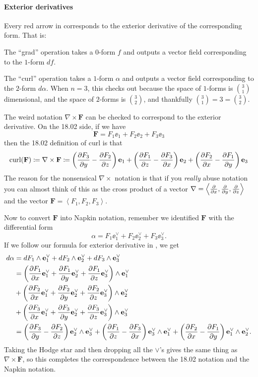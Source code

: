 \paragraph{Exterior derivatives}
Every red arrow in  corresponds to the exterior derivative
of the corresponding form.
That is:
\begin{itemize}
	\ii The ``grad'' operation takes a $0$-form $f$ and outputs a vector field
	corresponding to the $1$-form $df$.

	\ii The ``curl'' operation takes a $1$-form $\alpha$ and outputs a vector field
	corresponding to the $2$-form $d\alpha$.
	When $n = 3$, this checks out because the space of $1$-forms is $\binom 31$ dimensional,
	and the space of $2$-forms is $\binom 32$, and thankfully $\binom 31 = 3 = \binom 32$.

	The weird notation $\nabla \times \mathbf{F}$
	can be checked to correspond to the exterior derivative.
	On the 18.02 side, if we have
	\[ \mathbf{F} = F_1 \ee_1 + F_2 \ee_2 + F_3 \ee_3 \]
	then the 18.02 definition of curl is that
	\[ \operatorname{curl}(\mathbf{F}) \coloneqq \nabla \times \mathbf{F} \coloneqq
		\left( \pdv{F_3}{y} - \pdv{F_2}{z} \right) \mathbf e_1
		+ \left( \pdv{F_1}{z} - \pdv{F_3}{x} \right) \mathbf e_2
		+ \left( \pdv{F_2}{x} - \pdv{F_1}{y} \right) \mathbf e_3
	\]
	The reason for the nonsensical $\nabla \times$ notation
	is that if you \emph{really} abuse notation you can almost think of this as
	the cross product of a vector $\nabla = \left< \pdv{}x, \pdv{}y, \pdv{}z \right>$
	and the vector $\mathbf{F} = \left< F_1, F_2, F_3 \right>$.

	Now to convert $\mathbf{F}$ into Napkin notation,
	remember we identified $\mathbf{F}$ with the differential form
	\[ \alpha = F_1 \ee_1^\vee + F_2 \ee_2^\vee + F_3 \ee_3^\vee. \]
	If we follow our formula for exterior derivative in , we get
	\begin{align*}
		d\alpha &= dF_1 \wedge \mathbf e_1^\vee + dF_2 \wedge \mathbf e_2^\vee + dF_3 \wedge \mathbf e_3^\vee \\
		&= \left( \pdv{F_1}{x} \mathbf e_1^\vee + \pdv{F_1}{y} \mathbf e_2^\vee + \pdv{F_1}{z} \mathbf e_3^\vee \right) \wedge \mathbf e_1^\vee \\
		&+ \left( \pdv{F_2}{x} \mathbf e_1^\vee + \pdv{F_2}{y} \mathbf e_2^\vee + \pdv{F_2}{z} \mathbf e_3^\vee \right) \wedge \mathbf e_2^\vee \\
		&+ \left( \pdv{F_3}{x} \mathbf e_1^\vee + \pdv{F_3}{y} \mathbf e_2^\vee + \pdv{F_3}{z} \mathbf e_3^\vee \right) \wedge \mathbf e_3^\vee \\
		&=
		\left( \pdv{F_3}{y} - \pdv{F_2}{z} \right) \mathbf e_2^\vee \wedge \mathbf e_3^\vee
		+ \left( \pdv{F_1}{z} - \pdv{F_3}{x} \right) \mathbf e_3^\vee \wedge \mathbf e_1^\vee
		+ \left( \pdv{F_2}{x} - \pdv{F_1}{y} \right) \mathbf e_1^\vee \wedge \mathbf e_2^\vee.
	\end{align*}
	Taking the Hodge star and then dropping all the $\vee$'s
	gives the same thing as $\nabla \times \mathbf{F}$,
	so this completes the correspondence between the 18.02 notation and the Napkin notation.


\end{itemize}
